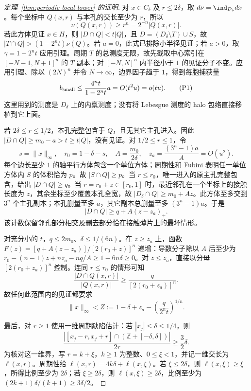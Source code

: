 \begin{proof}[定理~\ref{thm:periodic-local-lower} 的证明]
对 $x\in C_\delta$ 及 $r\le2\delta$，取 $d\nu=\ind_{D_\delta}dx$。每个坐标中 $Q(x,r)$ 与本孔的交长至少为 $r$，所以
\[
 \nu(Q(x,r))\ge r^n=2^{-n}|Q(x,r)|.
\]
若此方体见证 $x\in H$，则 $|D\cap Q|<t|Q|$，且
$D=(D_\delta\setminus T)\cup S$，故
$|T\cap Q|>(1-2^nt)\nu(Q)$。若 $a=0$，此式已排除小半径见证；若 $a>0$，取 $\gamma=1-2^nt$ 应用引理。周期 $T$ 的总测度无限，故先截取中心索引在 $[-N-1,N+1]^n$ 的 $T$ 副本；对 $[-N,N]^n$ 内半径小于 $1$ 的见证分子不变。应用引理、除以 $(2N)^n$ 并令 $N\to\infty$，边界因子趋于 $1$，得到每胞捕获量
\[
 b_{\rm small}\le \frac{4^nt}{1-2^nt}a
 =O(t^2u)=o(tu).\tag{P1}\label{eq:small-capture}
\]
这里用到的测度是 $D_\delta$ 上的内禀测度；没有将 Lebesgue 测度的 halo 包络直接移植到它上面。

若 $2\delta\le r\le1/2$，本孔完整包含于 $Q$，且无其它主孔进入。因此
$|D\cap Q|\ge m_0-a>t\ge t|Q|$，没有见证。对 $1/2\le r\le1$，令
\[
 s=\|x\|_\infty,\quad r_0=1-\delta-s,\quad
 A=\frac{m_0}{2\delta},\quad z_a=\frac{(3^n-1)a}{A}=O(u^2).
\]
每个边长至少 $1$ 的轴平行方体包含一个单位方体；周期性和 Fubini 表明任一单位方体内 $S$ 的体积恰为 $p$。故 $|S\cap Q|\ge p$。当 $r\le r_0$，唯一进入的原主孔完整包含，给出 $|D\cap Q|\ge q$。当 $r=r_0+z\in[r_0,1]$ 时，最近邻孔在一个坐标上的接触长度为 $z$，其余坐标至少覆盖本孔全宽，故 $|D_\delta\cap Q|\ge m_0+Az$。此方体至多交到 $3^n$ 个主孔副本；本孔删量至多 $a$，其它副本总删量至多 $(3^n-1)a$。于是
\[
 |D\cap Q|\ge q+A(z-z_a)_+.\tag{P2}\label{eq:neighbor-mass}
\]
该计数保留邻孔部分相交及删去部分恰在接触薄片上的最坏情形。

对充分小的 $t$，$q\le2m_0$、$\delta\le1/(6n)$。在 $z\ge z_a$ 上，函数
$F(z)=[q+A(z-z_a)]/[2(r_0+z)]^n$ 递增：导数分子除以 $A$ 后至少为
$r_0-(n-1)z+nz_a-nq/A\ge1-6n\delta\ge0$。对 $z\le z_a$，直接以分母 $[2(r_0+z_a)]^n$ 控制。连同 $r\le r_0$ 的情形可知
\[
 \frac{|D\cap Q(x,r)|}{|Q(x,r)|}\ge\frac q{[2(r_0+z_a)]^n}.
\]
故任何此范围内的见证都要求
\[
 \|x\|_\infty<Z:=1-\delta+z_a-
 \left(\frac q{2^nt}\right)^{1/n}.\tag{P3}\label{eq:Z-local}
\]

最后，对 $r\ge1$ 使用一维周期缺陷估计：若 $|x_j|\le\delta\le1/4$，则
\[
 \frac{|[x_j-r,x_j+r]\cap(\mathbb Z+[-\delta,\delta])|}{2r}
 \ge\frac32\delta.
\]
为核对这一维界，写 $r=k+\xi$，$k\ge1$ 为整数、$0\le\xi<1$，并记一维交长为 $\ell(x,r)$。周期性给 $\ell(x,r)=4k\delta+\ell(x,\xi)$。若 $\xi\le2\delta$，则 $\ell(x,\xi)\ge\xi$，所得比例至少为 $2\delta$；若 $\xi\ge2\delta$，则 $\ell(x,\xi)\ge2\delta$，比例至少为 $(2k+1)\delta/(k+1)\ge3\delta/2$。


\end{proof}
